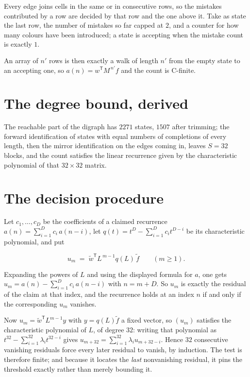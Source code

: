 \documentclass[11pt]{article}
\theoremstyle{definition}
\begin{document}
Every edge joins cells in the same or in consecutive rows, so the mistakes contributed by a row are decided by that row and the one above it. Take as state the last row, the number of mistakes so far capped at $2$, and a counter for how many colours have been introduced; a state is accepting when the mistake count is exactly $1$.

An array of $n'$ rows is then exactly a walk of length $n'$ from the empty state to an accepting one, so $a(n) = w^{\mathsf T}M^{\,n'}f$ and the count is C-finite.

\section{The degree bound, derived}

The reachable part of the digraph has $2271$ states, $1507$ after trimming; the forward identification of states with equal numbers of completions of every length, then the mirror identification on the edges coming in, leaves $S = 32$ blocks, and the count satisfies the linear recurrence given by the characteristic polynomial of that $32\times32$ matrix.

\section{The decision procedure}

Let $c_1,\dots,c_D$ be the coefficients of a claimed recurrence $a(n) = \sum_{i=1}^{D} c_i\,a(n-i)$, let $q(t) = t^{D} - \sum_{i=1}^{D} c_i t^{D-i}$ be its characteristic polynomial, and put

\[u_m \;=\; \tilde w^{\mathsf T} L^{\,m-1} q(L)\,\tilde f \qquad (m \ge 1).\]

Expanding the powers of $L$ and using the displayed formula for $a$, one gets $u_m = a(n) - \sum_{i=1}^{D} c_i\,a(n-i)$ with $n = m + D$. So $u_m$ is exactly the residual of the claim at that index, and the recurrence holds at an index $n$ if and only if the corresponding $u_m$ vanishes.

Now $u_m = \tilde w^{\mathsf T} L^{m-1} y$ with $y = q(L)\tilde f$ a fixed vector, so $(u_m)$ satisfies the characteristic polynomial of $L$, of degree $32$: writing that polynomial as $t^{32} - \sum_{i=1}^{32} \lambda_i t^{32-i}$ gives $u_{m+32} = \sum_{i=1}^{32} \lambda_i u_{m+32-i}$. Hence $32$ consecutive vanishing residuals force every later residual to vanish, by induction. The test is therefore finite; and because it locates the {\itshape last} nonvanishing residual, it pins the threshold exactly rather than merely bounding it.
\end{document}
